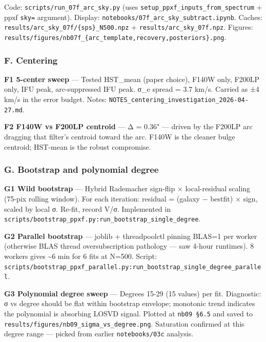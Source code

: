 \documentclass[
  10pt,
]{article}
\begin{document}
Code: \texttt{scripts/run\_07f\_arc\_sky.py} (uses \texttt{setup\_ppxf\_inputs\_from\_spectrum} + ppxf \texttt{sky=} argument). Display: \texttt{notebooks/07f\_arc\_sky\_subtract.ipynb}. Caches:
\texttt{results/arc\_sky\_07f/\{sps\}\_N500.npz} + \texttt{results/arc\_sky\_07f.npz}. Figures: \texttt{results/figures/nb07f\_\{arc\_template,recovery,posteriors\}.png}.

\hypertarget{f.-centering}{%
\subsubsection{F. Centering}\label{f.-centering}}

\textbf{F1 5-center sweep} --- Tested HST\_mean (paper choice), F140W only, F200LP only, IFU peak, arc-suppressed IFU peak. σ\_e spread = 3.7 km/s. Carried as ±4 km/s in the error budget. Notes:
\texttt{NOTES\_centering\_investigation\_2026-04-27.md}.

\textbf{F2 F140W vs F200LP centroid} --- Δ = 0.36" --- driven by the F200LP arc dragging that filter's centroid toward the arc. F140W is the cleaner bulge centroid; HST-mean is the robust compromise.

\hypertarget{g.-bootstrap-and-polynomial-degree}{%
\subsubsection{G. Bootstrap and polynomial degree}\label{g.-bootstrap-and-polynomial-degree}}

\textbf{G1 Wild bootstrap} --- Hybrid Rademacher sign-flip × local-residual scaling (75-pix rolling window). For each iteration: residual = (galaxy − bestfit) × sign, scaled by local σ. Re-fit, record
V/σ. Implemented in \texttt{scripts/bootstrap\_ppxf.py:run\_bootstrap\_single\_degree}.

\textbf{G2 Parallel bootstrap} --- joblib + threadpoolctl pinning BLAS=1 per worker (otherwise BLAS thread oversubscription pathology --- saw 4-hour runtimes). 8 workers gives \textasciitilde6 min for
6 fits at N=500. Script: \texttt{scripts/bootstrap\_ppxf\_parallel.py:run\_bootstrap\_single\_degree\_parallel}.

\textbf{G3 Polynomial degree sweep} --- Degrees 15-29 (15 values) per fit. Diagnostic: σ vs degree should be flat within bootstrap envelope; monotonic trend indicates the polynomial is absorbing LOSVD
signal. Plotted at \texttt{nb09\ §6.5} and saved to \texttt{results/figures/nb09\_sigma\_vs\_degree.png}. Saturation confirmed at this degree range --- picked from earlier \texttt{notebooks/03c}
analysis.
\end{document}
